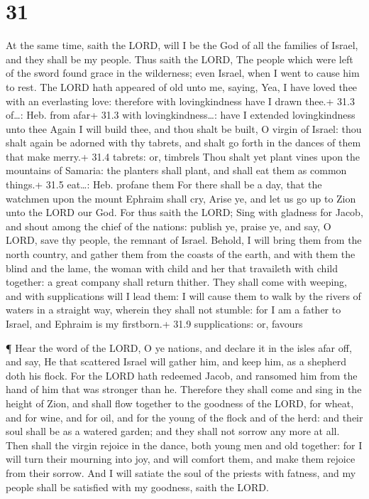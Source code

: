 \hypertarget{section-30}{%
\section{31}\label{section-30}}

 At the same time, saith the LORD, will I be the God of all
the families of Israel, and they shall be my people.  Thus
saith the LORD, The people which were left of the sword found grace in
the wilderness; even Israel, when I went to cause him to rest.
 The LORD hath appeared of old unto me, saying, Yea, I have
loved thee with an everlasting love: therefore with lovingkindness have
I drawn thee.+ 31.3 of\ldots: Heb. from afar+ 31.3 with
lovingkindness\ldots: have I extended lovingkindness unto thee
 Again I will build thee, and thou shalt be built, O virgin
of Israel: thou shalt again be adorned with thy tabrets, and shalt go
forth in the dances of them that make merry.+ 31.4 tabrets: or, timbrels
 Thou shalt yet plant vines upon the mountains of Samaria:
the planters shall plant, and shall eat them as common things.+ 31.5
eat\ldots: Heb. profane them  For there shall be a day, that
the watchmen upon the mount Ephraim shall cry, Arise ye, and let us go
up to Zion unto the LORD our God.  For thus saith the LORD;
Sing with gladness for Jacob, and shout among the chief of the nations:
publish ye, praise ye, and say, O LORD, save thy people, the remnant of
Israel.  Behold, I will bring them from the north country,
and gather them from the coasts of the earth, and with them the blind
and the lame, the woman with child and her that travaileth with child
together: a great company shall return thither.  They shall
come with weeping, and with supplications will I lead them: I will cause
them to walk by the rivers of waters in a straight way, wherein they
shall not stumble: for I am a father to Israel, and Ephraim is my
firstborn.+ 31.9 supplications: or, favours

 ¶ Hear the word of the LORD, O ye nations, and declare it
in the isles afar off, and say, He that scattered Israel will gather
him, and keep him, as a shepherd doth his flock.  For the
LORD hath redeemed Jacob, and ransomed him from the hand of him that was
stronger than he.  Therefore they shall come and sing in
the height of Zion, and shall flow together to the goodness of the LORD,
for wheat, and for wine, and for oil, and for the young of the flock and
of the herd: and their soul shall be as a watered garden; and they shall
not sorrow any more at all.  Then shall the virgin rejoice
in the dance, both young men and old together: for I will turn their
mourning into joy, and will comfort them, and make them rejoice from
their sorrow.  And I will satiate the soul of the priests
with fatness, and my people shall be satisfied with my goodness, saith
the LORD.

